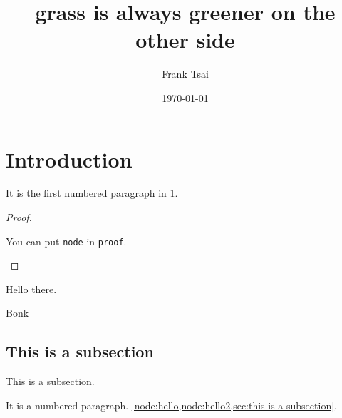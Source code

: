\documentclass{zett}
\title{grass is always greener on the other side}
\author{Frank Tsai}
\date{\today}
\begin{document}
\maketitle
\tableofcontents

\section{Introduction}
\label{sec:introduction}

\begin{node}
  \label{node:hello}
  It is the first numbered paragraph in \cref{sec:introduction}.
\end{node}

\begin{proof}
  \begin{node}
    \label{node:hello2}
    You can put \verb|node| in \verb|proof|.
  \end{node}
\end{proof}

\begin{thm}
  Hello there.
\end{thm}

\begin{rmk}
  Bonk
\end{rmk}

\subsection{This is a subsection}
\label{sec:this-is-a-subsection}

This is a subsection.

\begin{node}
  It is a numbered paragraph.
  \cref{node:hello,node:hello2,sec:this-is-a-subsection}.
\end{node}




\end{document}
